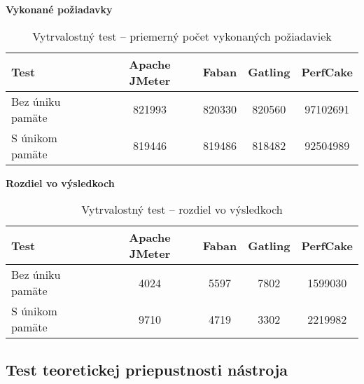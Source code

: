 \documentclass[12pt,oneside,final]{fithesis-utf8}
\begin{document}
\begin{itemize}
\textbf{Vykonané požiadavky}\\

\begin{table}[H]
\begin{center}
\begin{tabular}{ | l | c | c | c | c |}
		\hline
		 \textbf{Test} & \textbf{Apache JMeter} & \textbf{Faban} & \textbf{Gatling} & \textbf{PerfCake} \\ \hline
		 Bez úniku pamäte & 821993 & 820330 & 820560 & 97102691 \\ \hline
 		 S únikom pamäte & 819446 & 819486 & 818482 & 92504989 \\ \hline
		 
\end{tabular}
\end{center}
\caption{Vytrvalostný test -- priemerný počet vykonaných požiadaviek}
\end{table}


\textbf{Rozdiel vo výsledkoch}\\

\begin{table}[H]
\begin{center}
\begin{tabular}{ | l | c | c | c | c |}
		\hline
		 \textbf{Test} & \textbf{Apache JMeter} & \textbf{Faban} & \textbf{Gatling} & \textbf{PerfCake} \\ \hline
		 Bez úniku pamäte & 4024 & 5597 & 7802 & 1599030 \\ \hline
 		 S únikom pamäte & 9710 & 4719 & 3302 & 2219982 \\ \hline
		 
\end{tabular}
\end{center}
\caption{Vytrvalostný test -- rozdiel vo výsledkoch}
\end{table}

\end{itemize}

\subsection{Test teoretickej priepustnosti nástroja}
\end{document}
